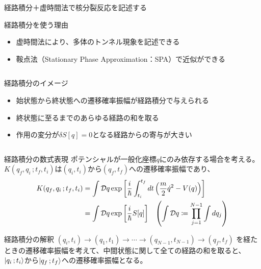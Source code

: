 \documentclass[14pt,aspectratio=169,xcolor=dvipsnames,table,dvipdfmx]{beamer}
\theoremstyle{definition}
\begin{document}
\begin{frame}{経路積分＋虚時間法で核分裂反応を記述する}
  \begin{block}{経路積分を使う理由}
    \begin{itemize}
      \item 虚時間法により、多体のトンネル現象を記述できる
      \item 鞍点法（Stationary Phase Approximation：SPA）で近似ができる
    \end{itemize}
  \end{block}
  \begin{columns}[t]
    \begin{column}{.53\textwidth}
      \vspace{-5mm}
      \begin{exampleblock}{経路積分のイメージ}
        \begin{itemize}
          \item 始状態から終状態への遷移確率振幅が経路積分で与えられる
          \item 終状態に至るまでのあらゆる経路の和を取る
          \item 作用の変分が$\delta S[q]=0$となる経路からの寄与が大きい
        \end{itemize}
      \end{exampleblock}
    \end{column}
    \begin{column}{.44\textwidth}
    \end{column}
  \end{columns}

\end{frame}


\begin{frame}{経路積分の数式表現}
  ポテンシャルが一般化座標$q$にのみ依存する場合を考える。\\
  $K(q_f,q_i\,;t_f,t_i)$は$(q_i,t_i)$から$(q_f,t_f)$への遷移確率振幅であり、
  \begin{align*}
    K(q_f,q_i\,;t_f,t_i) & = \int\mathcal{D}q
    \exp\qty[\frac{i}{\hbar}\int_{t_i}^{t_f}dt\,\qty(\frac{m}{2}\dot{q}^2 - V(q))]                                                            \\
                         & = \int\mathcal{D}q\exp\qty[\frac{i}{\hbar}S[q]]\quad \qty(\int \mathcal{D}q \coloneqq \prod_{j=1}^{N-1} \int dq_j)
  \end{align*}
  \begin{block}{経路積分の解釈}
    $(q_i,t_i)\to(q_1,t_1)\to\cdots\to(q_{N-1},t_{N-1})\to(q_f,t_f)$
    を経たときの遷移確率振幅を考えて、中間状態に関して全ての経路の和を取ると、\\
    $\ket{q_i\,;t_i}$から$\ket{q_f\,;t_f}$への遷移確率振幅となる。
  \end{block}
\end{frame}
\end{document}
